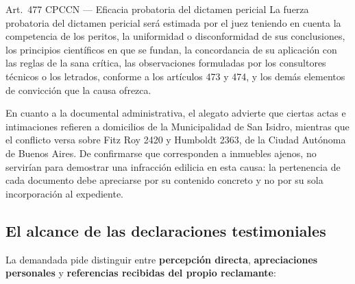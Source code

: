 \documentclass[12pt,oneside]{book}
\begin{document}

\begin{norma}{Art.~477 CPCCN --- Eficacia probatoria del dictamen pericial}
La fuerza probatoria del dictamen pericial ser\'a estimada por el juez teniendo en cuenta la competencia de los peritos, la uniformidad o disconformidad de sus conclusiones, los principios cient\'ificos en que se fundan, la concordancia de su aplicaci\'on con las reglas de la sana cr\'itica, las observaciones formuladas por los consultores t\'ecnicos o los letrados, conforme a los art\'iculos 473 y 474, y los dem\'as elementos de convicci\'on que la causa ofrezca.
\end{norma}

En cuanto a la documental administrativa, el alegato advierte que ciertas actas e intimaciones refieren a domicilios de la Municipalidad de San Isidro, mientras que el conflicto versa sobre Fitz Roy 2420 y Humboldt 2363, de la Ciudad Aut\'onoma de Buenos Aires. De confirmarse que corresponden a inmuebles ajenos, no servir\'ian para demostrar una infracci\'on edilicia en esta causa: la pertenencia de cada documento debe apreciarse por su contenido concreto y no por su sola incorporaci\'on al expediente.

\subsection{El alcance de las declaraciones testimoniales}

La demandada pide distinguir entre \textbf{percepci\'on directa}, \textbf{apreciaciones personales} y \textbf{referencias recibidas del propio reclamante}:
\end{document}
